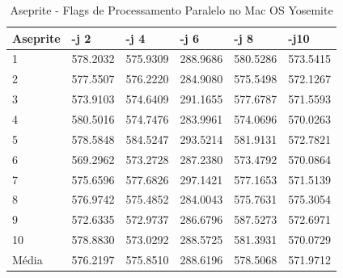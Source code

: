 \begin{table}[!ht]
\centering
\tiny
\caption{Aseprite - Flags de Processamento Paralelo no Mac OS Yosemite}
\label{tab:flag_processamento_paralelo:mac:aseprite}
\begin{tabular}{llllll}
\textbf{Aseprite} & \textbf{-j 2} & \textbf{-j 4} & \textbf{-j 6} & \textbf{-j 8} & \textbf{-j10}  \\ \toprule
1                 & 578.2032      &   575.9309    &    288.9686   &     580.5286  &   573.5415  \\ 
2                 & 577.5507      &   576.2220    &    284.9080   &     575.5498  &   572.1267  \\ 
3                 & 573.9103      &   574.6409    &    291.1655   &     577.6787  &   571.5593  \\ 
4                 & 580.5016      &   574.7476    &    283.9961   &     574.0696  &   570.0263  \\ 
5                 & 578.5848      &   584.5247    &    293.5214   &     581.9131  &   572.7821  \\ 
6                 & 569.2962      &   573.2728    &    287.2380   &     573.4792  &   570.0864  \\ 
7                 & 575.6596      &   577.6826    &    297.1421   &     577.1653  &   571.5139  \\ 
8                 & 576.9742      &   575.4852    &    284.0043   &     575.7631  &   575.3054  \\ 
9                 & 572.6335      &   572.9737    &    286.6796   &     587.5273  &   572.6971  \\ 
10                & 578.8830      &   573.0292    &    288.5725   &     581.3931  &   570.0729  \\ \bottomrule
Média             & 576.2197      &   575.8510    &    288.6196   &     578.5068  &   571.9712  \\ 
\end{tabular}
\end{table}


